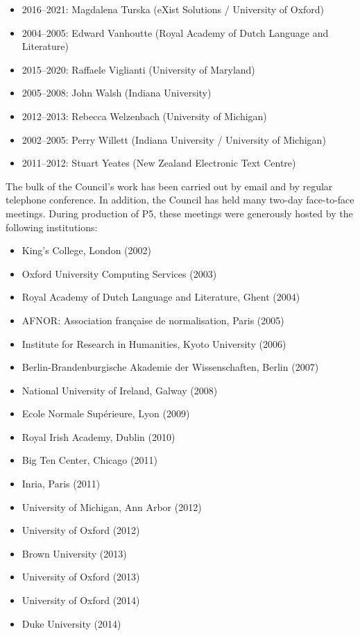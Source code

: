 \begin{itemize}
\item 2016–2021: Magdalena Turska (eXist Solutions / University of Oxford)
\item 2004–2005: Edward Vanhoutte (Royal Academy of Dutch Language and Literature)
\item 2015–2020: Raffaele Viglianti (University of Maryland)
\item 2005–2008: John Walsh (Indiana University)
\item 2012–2013: Rebecca Welzenbach (University of Michigan)
\item 2002–2005: Perry Willett (Indiana University / University of Michigan)
\item 2011–2012: Stuart Yeates (New Zealand Electronic Text Centre)
\end{itemize} \par
The bulk of the Council's work has been carried out by email and by regular telephone conference. In addition, the Council has held many two-day face-to-face meetings. During production of P5, these meetings were generously hosted by the following institutions: \begin{itemize}
\item King's College, London (2002)
\item Oxford University Computing Services (2003)
\item Royal Academy of Dutch Language and Literature, Ghent (2004)
\item AFNOR: Association française de normalisation, Paris (2005)
\item Institute for Research in Humanities, Kyoto University (2006)
\item Berlin-Brandenburgische Akademie der Wissenschaften, Berlin (2007)
\item National University of Ireland, Galway (2008)
\item Ecole Normale Supérieure, Lyon (2009)
\item Royal Irish Academy, Dublin (2010)
\item Big Ten Center, Chicago (2011)
\item Inria, Paris (2011)
\item University of Michigan, Ann Arbor (2012)
\item University of Oxford (2012)
\item Brown University (2013)
\item University of Oxford (2013)
\item University of Oxford (2014)
\item Duke University (2014)

\end{itemize}
